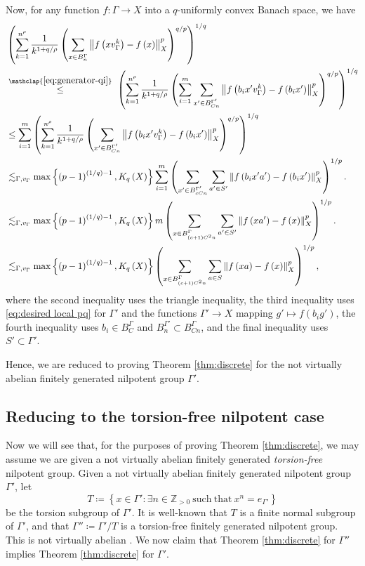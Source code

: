 \documentclass[11pt,reqno]{amsart}
\newcommand{\1}{\mathbf 1}
\begin{document}
Now, for any function $f:\Gamma \to X$ into a $q$-uniformly convex Banach space, we have
\begin{align*}
&\left(\sum_{k=1}^{n^\rho}\frac{1}{k^{1+q/\rho}}\left(\sum_{x\in B^\Gamma_n} \left\|f\left(xv_\Gamma^k\right)-f\left(x\right)\right\|_X^p\right)^{q/p}\right)^{1/q}\\
&\stackrel{\mathclap{\eqref{eq:generator-qi}}}{\le}~\left(\sum_{k=1}^{n^\rho}\frac{1}{k^{1+q/\rho}}\left(\sum_{i=1}^m\sum_{x'\in B^{\Gamma'}_{Cn}} \left\|f\left(b_ix'v_\Gamma^k\right)-f\left(b_ix'\right)\right\|_X^p\right)^{q/p}\right)^{1/q}\\
&\le \sum_{i=1}^m\left(\sum_{k=1}^{n^\rho}\frac{1}{k^{1+q/\rho}}\left(\sum_{x'\in B^{\Gamma'}_{Cn}} \left\|f\left(b_ix'v_\Gamma^k\right)-f\left(b_ix'\right)\right\|_X^p\right)^{q/p}\right)^{1/q}\\
&\lesssim_{\Gamma,v_\Gamma} \max\left\{\left(p-1\right)^{(1/q)-1},K_q\left(X\right)\right\} \sum_{i=1}^m
\left(\sum_{x'\in B^{\Gamma'}_{cCn}} \sum_{a'\in S'}\left\|f\left(b_ix'a'\right)-f\left(b_ix'\right)\right\|^p_X\right)^{1/p}.\\
&\lesssim_{\Gamma,v_\Gamma} \max\left\{\left(p-1\right)^{(1/q)-1},K_q\left(X\right)\right\} m
\left(\sum_{x\in B^\Gamma_{(c+1)C^2n}} \sum_{a'\in S'}\left\|f\left(xa'\right)-f\left(x\right)\right\|^p_X\right)^{1/p}.\\
&\lesssim_{\Gamma,v_\Gamma} \max\left\{\left(p-1\right)^{(1/q)-1},K_q\left(X\right)\right\} 
\left(\sum_{x\in B^\Gamma_{(c+1)C^2n}} \sum_{a\in S}\left\|f\left(xa\right)-f\left(x\right)\right\|^p_X\right)^{1/p},
\end{align*}
where the second inequality uses the triangle inequality, the third inequality uses \eqref{eq:desired local pq} for $\Gamma'$ and the functions $\Gamma'\to X$ mapping $g'\mapsto f\left(b_ig'\right)$, the fourth inequality uses $b_i\in B_C^\Gamma$ and $B_n^{\Gamma'}\subset B_{Cn}^\Gamma$, and the final inequality uses $S'\subset \Gamma'$.

Hence, we are reduced to proving Theorem \ref{thm:discrete} for the not virtually abelian finitely generated nilpotent group $\Gamma'$.
\subsection{Reducing to the torsion-free nilpotent case}

Now we will see that, for the purposes of proving Theorem \ref{thm:discrete}, we may assume we are given a not virtually abelian finitely generated \emph{torsion-free} nilpotent group. Given a not virtually abelian finitely generated nilpotent group $\Gamma'$, let
\[
T\coloneqq \left\{x\in \Gamma':\exists n\in \mathbb{Z}_{>0} \mathrm{~such~that~}x^n=e_{\Gamma'}\right\}
\]
be the torsion subgroup of $\Gamma'$. It is well-known that $T$ is a finite normal subgroup of $\Gamma'$, and that $\Gamma''\coloneqq \Gamma'/T$ is a torsion-free finitely generated nilpotent group. This is not virtually abelian \cite[Corollary 1.5]{de2007isometric}. We now claim that Theorem \ref{thm:discrete} for $\Gamma''$ implies Theorem \ref{thm:discrete} for $\Gamma'$.
\end{document}
